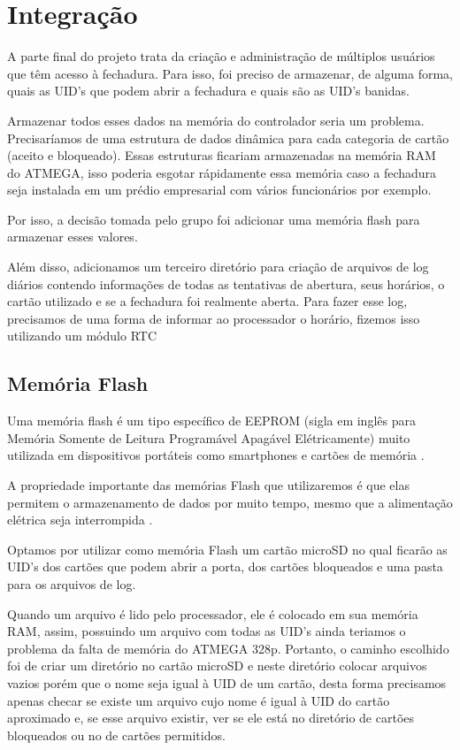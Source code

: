\chapter{Integração}

A parte final do projeto trata da criação
e administração de múltiplos usuários que têm
acesso à fechadura. Para isso, foi preciso de
armazenar, de alguma forma, quais as UID's que
podem abrir a fechadura e quais são as UID's banidas.

Armazenar todos esses dados na memória do controlador
seria um problema. Precisaríamos de uma estrutura de dados
dinâmica para cada categoria de cartão (aceito e bloqueado).
Essas estruturas ficariam armazenadas na memória RAM do ATMEGA,
isso poderia esgotar rápidamente essa memória caso a fechadura
seja instalada em um prédio empresarial com vários funcionários
por exemplo.

Por isso, a decisão tomada pelo grupo foi adicionar uma memória
flash para armazenar esses valores.

Além disso, adicionamos um terceiro diretório para criação
de arquivos de log diários contendo informações de todas
as tentativas de abertura, seus horários, o cartão utilizado
e se a fechadura foi realmente aberta. Para fazer esse log, precisamos de uma forma de informar ao processador
o horário, fizemos isso utilizando um módulo RTC

\section{Memória Flash}
Uma memória flash é um tipo específico de EEPROM (sigla em inglês
para Memória Somente de Leitura Programável Apagável Elétricamente)
muito utilizada em dispositivos portáteis como smartphones e cartões
de memória \cite{hammerschmidt2012}.

A propriedade importante das memórias Flash que utilizaremos
é que elas permitem o armazenamento de dados por muito tempo,
mesmo que a alimentação elétrica seja interrompida \cite{alencar2012}.

Optamos por utilizar como memória Flash um cartão microSD no qual
ficarão as UID's dos cartões que podem abrir a porta, dos cartões
bloqueados e uma pasta para os arquivos de log.

Quando um arquivo é lido pelo processador, ele é colocado em sua
memória RAM, assim, possuindo um arquivo com todas as UID's ainda
teriamos o problema da falta de memória do ATMEGA 328p. Portanto,
o caminho escolhido foi de criar um diretório no cartão microSD
e neste diretório colocar arquivos vazios porém que o nome seja igual
à UID de um cartão, desta forma precisamos apenas checar se existe
um arquivo cujo nome é igual à UID do cartão aproximado e, se esse
arquivo existir, ver se ele está no diretório de cartões bloqueados
ou no de cartões permitidos.

